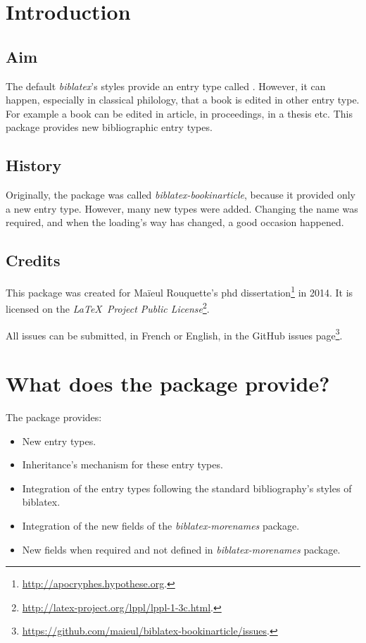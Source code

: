 \documentclass{ltxdockit}[2011/03/25]
\newcommand{\pkg}[1]{\emph{#1}}
\newcommand{\biblatex}{\emph{biblatex}\xspace}
\begin{document}
\printtitlepage
\tableofcontents

\section{Introduction}

\subsection{Aim}
The default \biblatex's styles provide an entry type called . 
However, it can happen, especially in classical philology, that a book is edited in other entry type. 
For example a book can be edited in article, in proceedings, in a thesis etc.
This package provides new bibliographic entry types.

\subsection{History}

Originally, the package was called \pkg{biblatex-bookinarticle}, because it provided only a new  entry type. 
However, many new types were added. 
Changing the name was required, and when the loading's way has changed, a good occasion happened.
\subsection{Credits}

This package was created for Maïeul Rouquette's phd dissertation\footnote{\url{http://apocryphes.hypothese.org}.} in 2014. It is licensed on the \emph{\LaTeX\ Project Public License}\footnote{\url{http://latex-project.org/lppl/lppl-1-3c.html}.}. 


All issues can be submitted, in French or English, in the GitHub issues page\footnote{\url{https://github.com/maieul/biblatex-bookinarticle/issues}.}.


\section{What does the package provide?}

The package provides:
\begin{itemize}
  \item New entry types. 
  \item Inheritance's mechanism for these entry types. 
  \item Integration of the entry types following the standard bibliography's styles of biblatex. 
  \item Integration of the new fields of the \pkg{biblatex-morenames} package.
  \item New fields when required and not defined in \pkg{biblatex-morenames} package.
\end{itemize}
\end{document}
